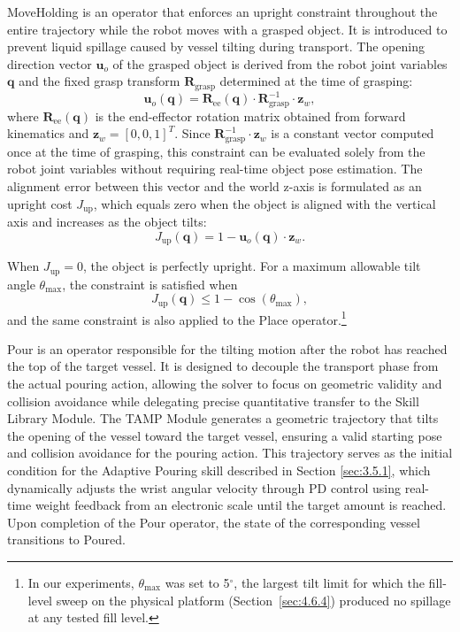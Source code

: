 \documentclass{ieeeaccess}
\newif\ifhighlight
\newcommand{\rev}[1]{\ifhighlight\hl{#1}\else#1\fi}
\begin{document}
MoveHolding is an operator that enforces an upright constraint throughout the entire trajectory while the robot moves with a grasped object. It is introduced to prevent liquid spillage caused by vessel tilting during transport. The opening direction vector $\mathbf{u}_{o}$ of the grasped object is derived from the robot joint variables $\mathbf{q}$ and the fixed grasp transform $\mathbf{R}_{\text{grasp}}$ determined at the time of grasping:
\begin{equation}
\mathbf{u}_{o}(\mathbf{q}) = \mathbf{R}_{\mathrm{ee}}(\mathbf{q}) \cdot \mathbf{R}_{\text{grasp}}^{-1} \cdot \mathbf{z}_{w},
\end{equation}
where $\mathbf{R}_{\mathrm{ee}}(\mathbf{q})$ is the end-effector rotation matrix obtained from forward kinematics and $\mathbf{z}_{w} = [0, 0, 1]^T$. Since $\mathbf{R}_{\text{grasp}}^{-1} \cdot \mathbf{z}_{w}$ is a constant vector computed once at the time of grasping, this constraint can be evaluated solely from the robot joint variables without requiring real-time object pose estimation. The alignment error between this vector and the world z-axis is formulated as an upright cost $J_{\mathrm{up}}$, which equals zero when the object is aligned with the vertical axis and increases as the object tilts:
\begin{equation}
J_{\mathrm{up}}(\mathbf{q}) = 1 - \mathbf{u}_{o}(\mathbf{q}) \cdot \mathbf{z}_{w}.
\end{equation}

When $J_{\mathrm{up}} = 0$, the object is perfectly upright. For a maximum allowable tilt angle $\theta_{\max}$, the constraint is satisfied when
\begin{equation}
J_{\mathrm{up}}(\mathbf{q}) \leq 1 - \cos(\theta_{\max}),
\end{equation}
and the same constraint is also applied to the Place operator.\footnote{\rev{In our experiments, $\theta_{\max}$ was set to 5$^\circ$, the largest tilt limit for which the fill-level sweep on the physical platform (Section~\ref{sec:4.6.4}) produced no spillage at any tested fill level.}}

Pour is an operator responsible for the tilting motion after the robot has reached the top of the target vessel. It is designed to decouple the transport phase from the actual pouring action, allowing the solver to focus on geometric validity and collision avoidance while delegating precise quantitative transfer to the Skill Library Module. The TAMP Module generates a geometric trajectory that tilts the opening of the vessel toward the target vessel, ensuring a valid starting pose and collision avoidance for the pouring action. This trajectory serves as the initial condition for the Adaptive Pouring skill described in Section \ref{sec:3.5.1}, which dynamically adjusts the wrist angular velocity through PD control using real-time weight feedback from an electronic scale until the target amount is reached. Upon completion of the Pour operator, the state of the corresponding vessel transitions to Poured.
\end{document}
